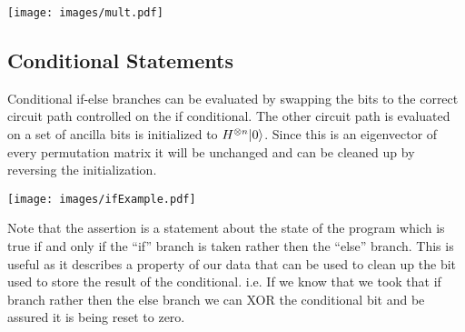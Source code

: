 
\texttt{[image: images/mult.pdf]}

\subsection{Conditional Statements}
Conditional if-else branches can be evaluated by swapping the bits to the correct circuit path controlled on the if conditional. 
The other circuit path is evaluated on a set of ancilla bits is initialized to $H^{\otimes n}{\left\vert{0}\right\rangle}$.
Since this is an eigenvector of every permutation matrix it will be unchanged and can be cleaned up by reversing the initialization.


\texttt{[image: images/ifExample.pdf]}

Note that the assertion is a statement about the state of the program which is true if and only if the ``if'' branch is taken rather then the ``else'' branch. 
This is useful as it describes a property of our data that can be used to clean up the bit used to store the result of the conditional. 
i.e. If we know that we took that if branch rather then the else branch we can XOR the conditional bit and be assured it is being reset to zero.



